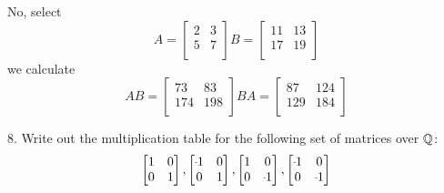 \begin{mdframed}[style=darkAnswer,frametitle={Joe Starr}]
  No, select $$A=\begin{bmatrix}
      2 & 3 \\
      5 & 7 \\
    \end{bmatrix}
    B=\begin{bmatrix}
      11 & 13 \\
      17 & 19 \\
    \end{bmatrix}$$
  we calculate
  $$AB=\begin{bmatrix}
      73  & 83  \\
      174 & 198 \\
    \end{bmatrix}
    BA=\begin{bmatrix}
      87  & 124 \\
      129 & 184 \\
    \end{bmatrix}$$
\end{mdframed}
\newpage
\begin{mdframed}[style=darkQuesion]
  8. Write out the multiplication table for the following set of matrices over
  $\mathbb{Q}$:
  $$\begin{bmatrix}
      1 & 0 \\
      0 & 1 \\
    \end{bmatrix},
    \begin{bmatrix}
      \m1 & 0 \\
      0   & 1 \\
    \end{bmatrix},
    \begin{bmatrix}
      1 & 0   \\
      0 & \m1 \\
    \end{bmatrix},
    \begin{bmatrix}
      \m1 & 0   \\
      0   & \m1 \\
    \end{bmatrix}$$


\end{mdframed}

